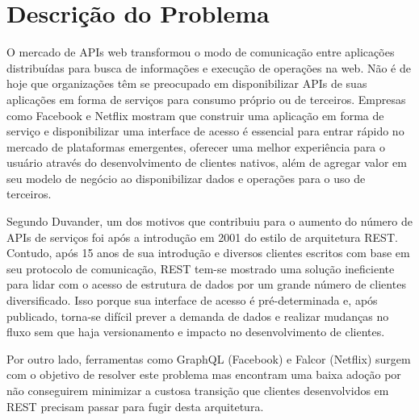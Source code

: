 \section[Descrição do Problema]{Descrição do Problema}

O mercado de APIs web transformou o modo de comunicação entre aplicações distribuídas para busca de informações e execução de operações na web. Não é de hoje que organizações têm se preocupado em disponibilizar APIs de suas aplicações em forma de serviços para consumo próprio ou de terceiros. Empresas como Facebook e Netflix mostram que construir uma aplicação em forma de serviço e disponibilizar uma interface de acesso é essencial para entrar rápido no mercado de plataformas emergentes, oferecer uma melhor experiência para o usuário através do desenvolvimento de clientes nativos, além de agregar valor em seu modelo de negócio ao disponibilizar dados e operações para o uso de terceiros. \cite{Art2016}

Segundo Duvander, um dos motivos que contribuiu para o aumento do número de APIs de serviços foi após a introdução em 2001 do estilo de arquitetura REST. Contudo, após 15 anos de sua introdução e diversos clientes escritos com base em seu protocolo de comunicação, REST tem-se mostrado uma solução ineficiente para lidar com o acesso de estrutura de dados por um grande número de clientes diversificado. Isso porque sua interface de acesso é pré-determinada e, após publicado, torna-se difícil prever a demanda de dados e realizar mudanças no fluxo sem que haja versionamento e impacto no desenvolvimento de clientes. \cite{Duvander2013-2}

Por outro lado, ferramentas como GraphQL (Facebook) e Falcor (Netflix) surgem com o objetivo de resolver este problema mas encontram uma baixa adoção por não conseguirem minimizar a custosa transição que clientes desenvolvidos em REST precisam passar para fugir desta arquitetura.
